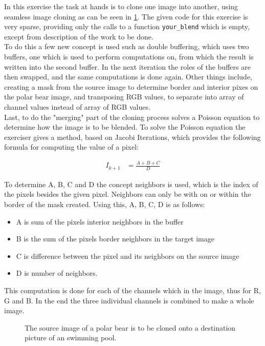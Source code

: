 In this exercise the task at hands is to clone one image into another, using seamless image cloning as can be seen in \cref{fig:cloning}. The given code for this exercise is very sparse, providing only the calls to a function \texttt{your\_blend} which is empty, except from description of the work to be done.\\

To do this a few new concept is used such as double buffering, which uses two buffers, one which is used to perform computations on, from which the result is written into the second buffer. In the next iteration the roles of the buffers are then swapped, and the same computations is done again. Other things include, creating a mask from the source image to determine border and interior pixes on the polar bear image, and transposing RGB values, to separate into array of channel values instead of array of RGB values.\\

Last, to do the "merging" part of the cloning process solves a Poisson equation to determine how the image is to be blended. To solve the Poisson equation the exerciser gives a method, based on Jacobi Iterations, which provides the following formula for computing the value of a pixel:

\begin{align*}
I_{k+1} &= \frac{A + B + C}{D}
\end{align*} 

To determine A, B, C and D the concept neighbors is used, which is the index of the pixels besides the given pixel. Neighbors can only be with on or within the border of the mask created. Using this, A, B, C, D is as follows:

\begin{itemize}
	\item A is sum of the pixels interior neighbors in the buffer
	\item B is the sum of the pixels border neighbors in the target image
	\item C is difference between the pixel and its neighbors on the source image
	\item D is number of neighbors.
\end{itemize}

This computation is done for each of the channels which in the image, thus for R, G and B. In the end the three individual channels is combined to make a whole image.

\begin{figure}[ht]
	\centering
	\caption{The source image of a polar bear is to be cloned onto a destination picture of an swimming pool.}
	\label{fig:cloning}
\end{figure}

